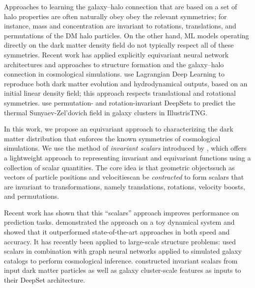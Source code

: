 Approaches to learning the galaxy--halo connection that are based on a set of halo properties are often naturally obey obey the relevant symmetries; for instance, mass and concentration are invariant to rotations, translations, and permutations of the DM halo particles.
On the other hand, ML models operating directly on the dark matter density field do not typically respect all of these symmetries.
Recent work has applied explicitly equivariant neural network architectures and approaches to structure formation and the galaxy--halo connection in cosmological simulations.
\cite{dai_learning_2020} use Lagrangian Deep Learning to reproduce both dark matter evolution and hydrodynamical outputs, based on an initial linear density field; this approach respects translational and rotational symmetries.
\cite{thiele_predicting_2022} use permutation- and rotation-invariant DeepSets to predict the thermal Sunyaev-Zel'dovich field in galaxy clusters in IllustrisTNG.

In this work, we propose an equivariant approach to characterizing the dark matter distribution that enforces the known symmetries of cosmological simulations. 
We use the method of \emph{invariant scalars} introduced by \cite{Villar2021a}, which offers a lightweight approach to representing invariant and equivariant functions using a collection of scalar quantities.
The core idea is that geometric objects{\emdash}such as vectors of particle positions and velocities{\emdash}can be \emph{contracted} to form scalars that are invariant to transformations, namely translations, rotations, velocity boosts, and permutations.

Recent work has shown that this ``scalars'' approach improves performance on prediction tasks.
\cite{yao_simple_2021} demonstrated the approach on a toy dynamical system and showed that it outperformed state-of-the-art approaches in both speed and accuracy.
It has recently been applied to large-scale structure problems: \cite{villanueva-domingo_learning_2022} used scalars in combination with graph neural networks applied to simulated galaxy catalogs to perform cosmological inference.
\cite{thiele_predicting_2022} constructed invariant scalars from input dark matter particles as well as galaxy cluster-scale features as inputs to their DeepSet architecture.

